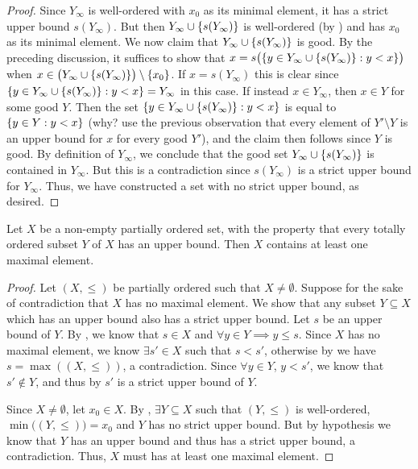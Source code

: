 \begin{proof}
  Since \(Y_{\infty}\) is well-ordered with \(x_0\) as its minimal element, it has a strict upper bound \(s(Y_{\infty})\).
  But then \(Y_{\infty} \cup \left\lbrace s(Y_{\infty})\right\rbrace\) is well-ordered (by ) and has \(x_0\) as its minimal element.
  We now claim that \(Y_{\infty} \cup \left\lbrace s(Y_{\infty})\right\rbrace\) is good.
  By the preceding discussion, it suffices to show that \(x = s\big(\set{y \in Y_{\infty} \cup \set{s(Y_{\infty})} : y < x}\big)\) when \(x \in \big(Y_{\infty} \cup \set{s(Y_{\infty})}\big) \setminus \set{x_0}\).
  If \(x = s(Y_{\infty})\) this is clear since \(\left\lbrace y \in Y_{\infty} \cup \left\lbrace s(Y_{\infty})\right\rbrace : y < x\right\rbrace = Y_{\infty}\) in this case.
  If instead \(x \in Y_{\infty}\), then \(x \in Y\) for some good \(Y\).
  Then the set \(\left\lbrace y \in Y_{\infty} \cup \left\lbrace s(Y_{\infty})\right\rbrace: y < x\right\rbrace\) is equal to \(\left\lbrace y \in Y : y < x\right\rbrace\)
  (why? use the previous observation that every element of \(Y' \setminus Y\) is an upper bound for \(x\) for every good \(Y'\)), and the claim then follows since \(Y\) is good.
  By definition of \(Y_{\infty}\), we conclude that the good set \(Y_{\infty} \cup \left\lbrace s(Y_{\infty})\right\rbrace\) is contained in \(Y_{\infty}\).
  But this is a contradiction since \(s(Y_{\infty})\) is a strict upper bound for \(Y_{\infty}\).
  Thus, we have constructed a set with no strict upper bound, as desired.
\end{proof}

\begin{lem}\label{i:8.5.15}
  Let \(X\) be a non-empty partially ordered set, with the property that every totally ordered subset \(Y\) of \(X\) has an upper bound.
  Then \(X\) contains at least one maximal element.
\end{lem}

\begin{proof}
  Let \((X, \leq)\) be partially ordered such that \(X \neq \emptyset\).
  Suppose for the sake of contradiction that \(X\) has no maximal element.
  We show that any subset \(Y \subseteq X\) which has an upper bound also has a strict upper bound.
  Let \(s\) be an upper bound of \(Y\).
  By , we know that \(s \in X\) and \(\forall y \in Y \implies y \leq s\).
  Since \(X\) has no maximal element, we know \(\exists s' \in X\) such that \(s < s'\), otherwise by  we have \(s = \max((X, \leq))\), a contradiction.
  Since \(\forall y \in Y\), \(y < s'\), we know that \(s' \notin Y\), and thus by  \(s'\) is a strict upper bound of \(Y\).

  Since \(X \neq \emptyset\), let \(x_0 \in X\).
  By , \(\exists Y \subseteq X\) such that \((Y, \leq)\) is well-ordered, \(\min\big((Y, \leq)\big) = x_0\) and \(Y\) has no strict upper bound.
  But by hypothesis we know that \(Y\) has an upper bound and thus has a strict upper bound, a contradiction.
  Thus, \(X\) must has at least one maximal element.
\end{proof}

